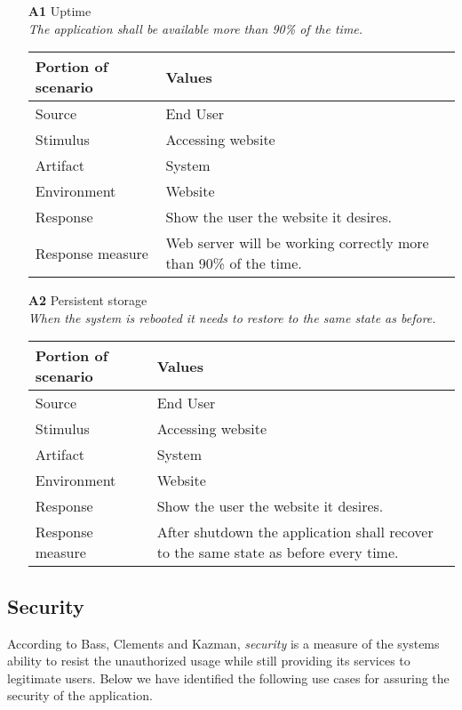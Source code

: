 \begin{itemize}
    \item[\textbf{A1}] Uptime \\
    \textit{\small{The application shall be available more than 90\% of the time.}}
        
    \begin{tabular}{| l | p{7cm} |}
        \hline
        \rowcolor[gray]{0.8}
        \textbf{Portion of scenario} & \textbf{Values} \\
        \hline
        Source & End User \\
        Stimulus & Accessing website \\
        Artifact & System \\
        Environment & Website \\
        Response & Show the user the website it desires. \\
        Response measure & Web server will be working correctly more than 90\% of the time. \\
        \hline
    \end{tabular}

    \item[\textbf{A2}] Persistent storage \\
    \textit{\small{When the system is rebooted it needs to restore to the same state as before.}}
        
    \begin{tabular}{| l | p{7cm} |}
        \hline
        \rowcolor[gray]{0.8}
        \textbf{Portion of scenario} & \textbf{Values} \\
        \hline
        Source & End User \\
        Stimulus & Accessing website \\
        Artifact & System \\
        Environment & Website \\
        Response & Show the user the website it desires. \\
        Response measure & After shutdown the application shall recover to the same state as before every time. \\
        \hline
    \end{tabular}
\end{itemize}

\subsection{Security}
According to Bass, Clements and Kazman, \emph{security} is a measure of the systems ability to resist the unauthorized usage while still providing its services to legitimate users\citep{ProgarkPensum}. Below we have identified the following use cases for assuring the security of the application.

